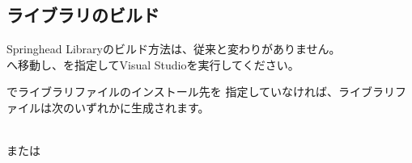 \subsection{ライブラリのビルド}
\label{subsec:BuildLibrary}

\noindent
Springhead Libraryのビルド方法は、従来と変わりがありません。\\
\build へ移動し、を指定してVisual Studioを実行してください。

\medskip
\noindent
{}でライブラリファイルのインストール先を
指定していなければ、ライブラリファイルは次のいずれかに生成されます。

\noindent
\hspace{20pt}\\
または\\
\hspace{20pt}\\

